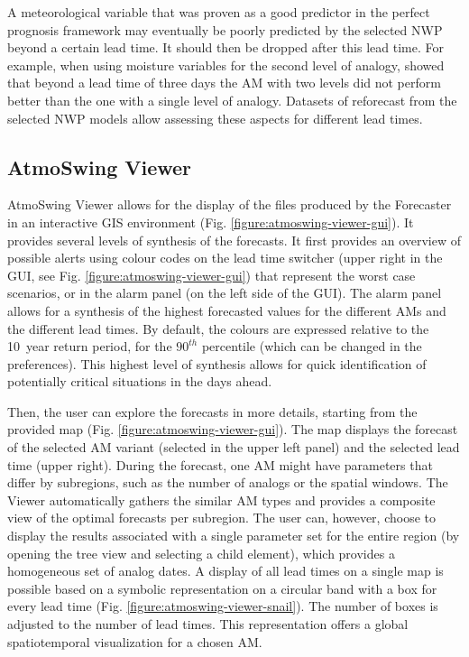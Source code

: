 \documentclass[gmdd]{copernicus}
\begin{document}
A meteorological variable that was proven as a good predictor in the perfect prognosis framework may eventually be poorly predicted by the selected NWP beyond a certain lead time. It should then be dropped after this lead time. For example, when using moisture variables for the second level of analogy, \citet{Thevenot2004} showed that beyond a lead time of three days the AM with two levels did not perform better than the one with a single level of analogy. Datasets of reforecast from the selected NWP models allow assessing these aspects for different lead times.


\subsection{AtmoSwing Viewer}
\label{sec:viewer}

AtmoSwing Viewer allows for the display of the files produced by the Forecaster in an interactive GIS environment (Fig. \ref{figure:atmoswing-viewer-gui}). It provides several levels of synthesis of the forecasts. It first provides an overview of possible alerts using colour codes on the lead time switcher (upper right in the GUI, see Fig. \ref{figure:atmoswing-viewer-gui}) that represent the worst case scenarios, or in the alarm panel (on the left side of the GUI). The alarm panel allows for a synthesis of the highest forecasted values for the different AMs and the different lead times. By default, the colours are expressed relative to the 10~year return period, for the $90^{th}$ percentile (which can be changed in the preferences). This highest level of synthesis allows for quick identification of potentially critical situations in the days ahead.

Then, the user can explore the forecasts in more details, starting from the provided map (Fig. \ref{figure:atmoswing-viewer-gui}). The map displays the forecast of the selected AM variant (selected in the upper left panel) and the selected lead time (upper right). During the forecast, one AM might have parameters that differ by subregions, such as the number of analogs or the spatial windows. The Viewer automatically gathers the similar AM types and provides a composite view of the optimal forecasts per subregion. The user can, however, choose to display the results associated with a single parameter set for the entire region (by opening the tree view and selecting a child element), which provides a homogeneous set of analog dates. A display of all lead times on a single map is possible based on a symbolic representation on a circular band with a box for every lead time (Fig. \ref{figure:atmoswing-viewer-snail}). The number of boxes is adjusted to the number of lead times. This representation offers a global spatiotemporal visualization for a chosen AM.
\end{document}
